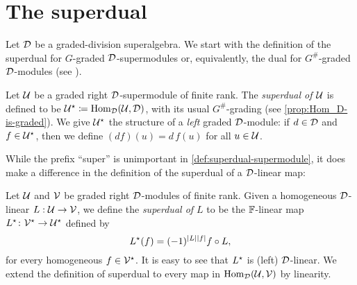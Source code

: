 \section{The superdual}\label{ssec:superdual}

Let $\mathcal{D}$ be a graded-division superalgebra. 
We start with the definition of the superdual for $G$-graded $\mathcal{D}$-supermodules or, equivalently, the dual for $G^\#$-graded $\mathcal{D}$-modules (see \cite[Definition 2.56]{livromicha}). 

\begin{defi}\label{def:superdual-supermodule}
    Let $\mathcal U$ be a graded right $\mathcal{D}$-supermodule of finite rank. 
    The \emph{superdual of $\mathcal U$} is defined to be $\mathcal U^\star \coloneqq \operatorname{Hom}_{\mathcal{D}} (\mathcal U,\mathcal{D})$, with its usual $G^\#$-grading (see \cref{prop:Hom_D-is-graded}). 
    We give $\mathcal U^\star$ the structure of a \emph{left} graded $\mathcal{D}$-module: if $d \in \mathcal{D}$ and $f \in \mathcal U ^\star$, then we define $(df)(u) = d\, f(u)$ for all $u\in \mathcal U$. 
\end{defi}

While the prefix ``super'' is unimportant in \cref{def:superdual-supermodule}, it does make a difference in the definition of the superdual of a $\mathcal{D}$-linear map:

\begin{defi}\label{defi:superdual-map}
    Let $\mathcal U$ and $\mathcal V$ be graded right $\mathcal{D}$-modules of finite rank. 
    Given a homogeneous $\mathcal{D}$-linear
    $L:\mathcal U \rightarrow \mathcal V$, we define the \emph{superdual of $L$} to be the $\mathbb{F}$-linear map $L^\star\colon \mathcal V^\star \rightarrow \mathcal U^\star$ defined by
    \[
        L^\star (f) = (-1)^{|L||f|} f \circ L,
    \] 
    for every homogeneous $f\in \mathcal V^\star$. 
    It is easy to see that $L^\star$ is (left) $\mathcal{D}$-linear. 
    We extend the definition of superdual to every map in $\operatorname{Hom}_{\mathcal{D}} (\mathcal U, \mathcal V)$ by linearity.
\end{defi}





